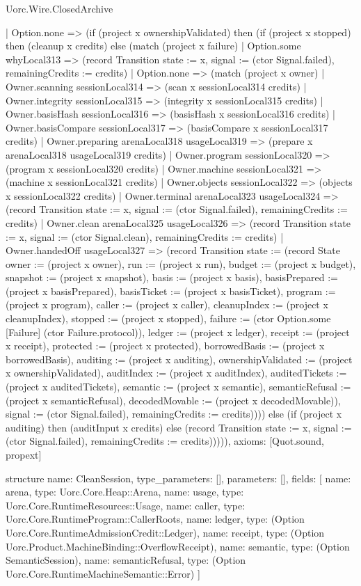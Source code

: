 \begin{lexlean}{Uorc.Wire.ClosedArchive}
\begin{semanticmodule}
{    | Option.none => (if (project x ownershipValidated) then (if (project x stopped) then (cleanup x credits) else (match (project x failure)
      | Option.some whyLocal313 => (record Transition {state := x, signal := (ctor Signal.failed), remainingCredits := credits})
      | Option.none => (match (project x owner)
        | Owner.scanning sessionLocal314 => (scan x sessionLocal314 credits)
        | Owner.integrity sessionLocal315 => (integrity x sessionLocal315 credits)
        | Owner.basisHash sessionLocal316 => (basisHash x sessionLocal316 credits)
        | Owner.basisCompare sessionLocal317 => (basisCompare x sessionLocal317 credits)
        | Owner.preparing arenaLocal318 usageLocal319 => (prepare x arenaLocal318 usageLocal319 credits)
        | Owner.program sessionLocal320 => (program x sessionLocal320 credits)
        | Owner.machine sessionLocal321 => (machine x sessionLocal321 credits)
        | Owner.objects sessionLocal322 => (objects x sessionLocal322 credits)
        | Owner.terminal arenaLocal323 usageLocal324 => (record Transition {state := x, signal := (ctor Signal.failed), remainingCredits := credits})
        | Owner.clean arenaLocal325 usageLocal326 => (record Transition {state := x, signal := (ctor Signal.clean), remainingCredits := credits})
        | Owner.handedOff usageLocal327 => (record Transition {state := (record State {owner := (project x owner), run := (project x run), budget := (project x budget), snapshot := (project x snapshot), basis := (project x basis), basisPrepared := (project x basisPrepared), basisTicket := (project x basisTicket), program := (project x program), caller := (project x caller), cleanupIndex := (project x cleanupIndex), stopped := (project x stopped), failure := (ctor Option.some [Failure] (ctor Failure.protocol)), ledger := (project x ledger), receipt := (project x receipt), protected := (project x protected), borrowedBasis := (project x borrowedBasis), auditing := (project x auditing), ownershipValidated := (project x ownershipValidated), auditIndex := (project x auditIndex), auditedTickets := (project x auditedTickets), semantic := (project x semantic), semanticRefusal := (project x semanticRefusal), decodedMovable := (project x decodedMovable)}), signal := (ctor Signal.failed), remainingCredits := credits})))) else (if (project x auditing) then (auditInput x credits) else (record Transition {state := x, signal := (ctor Signal.failed), remainingCredits := credits}))))),
  axioms: [Quot.sound, propext]
}

structure{
  name: CleanSession,
  type_parameters: [],
  parameters: [],
  fields: [
    {name: arena, type: Uorc.Core.Heap::Arena},
    {name: usage, type: Uorc.Core.RuntimeResources::Usage},
    {name: caller, type: Uorc.Core.RuntimeProgram::CallerRoots},
    {name: ledger, type: (Option Uorc.Core.RuntimeAdmissionCredit::Ledger)},
    {name: receipt, type: (Option Uorc.Product.MachineBinding::OverflowReceipt)},
    {name: semantic, type: (Option SemanticSession)},
    {name: semanticRefusal, type: (Option Uorc.Core.RuntimeMachineSemantic::Error)}
  ]
}


\end{semanticmodule}
\end{lexlean}
